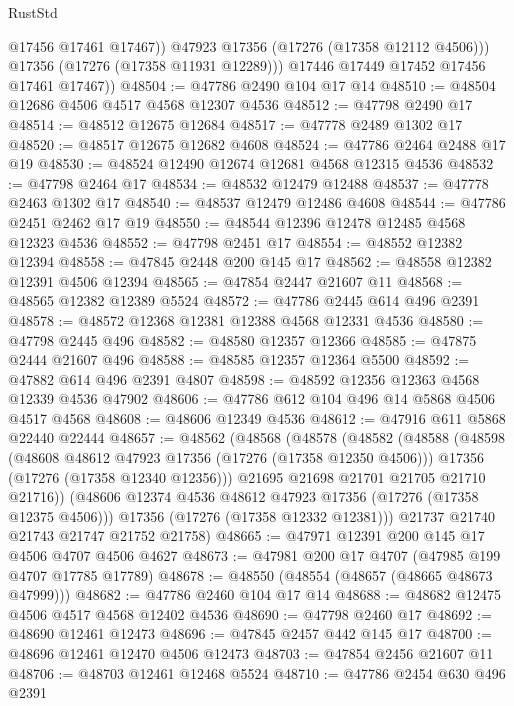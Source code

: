\begin{lexlean}{RustStd}
\begin{coremodule}
                @17456
                @17461
                @17467))
            @47923
            @17356
            (@17276 (@17358 @12112 @4506)))
          @17356
          (@17276 (@17358 @11931 @12289)))
        @17446
        @17449
        @17452
        @17456
        @17461
        @17467))
@48504 := @47786 @2490 @104 @17 @14
@48510 := @48504 @12686 @4506 @4517 @4568 @12307 @4536
@48512 := @47798 @2490 @17
@48514 := @48512 @12675 @12684
@48517 := @47778 @2489 @1302 @17
@48520 := @48517 @12675 @12682 @4608
@48524 := @47786 @2464 @2488 @17 @19
@48530 := @48524 @12490 @12674 @12681 @4568 @12315 @4536
@48532 := @47798 @2464 @17
@48534 := @48532 @12479 @12488
@48537 := @47778 @2463 @1302 @17
@48540 := @48537 @12479 @12486 @4608
@48544 := @47786 @2451 @2462 @17 @19
@48550 := @48544 @12396 @12478 @12485 @4568 @12323 @4536
@48552 := @47798 @2451 @17
@48554 := @48552 @12382 @12394
@48558 := @47845 @2448 @200 @145 @17
@48562 := @48558 @12382 @12391 @4506 @12394
@48565 := @47854 @2447 @21607 @11
@48568 := @48565 @12382 @12389 @5524
@48572 := @47786 @2445 @614 @496 @2391
@48578 := @48572 @12368 @12381 @12388 @4568 @12331 @4536
@48580 := @47798 @2445 @496
@48582 := @48580 @12357 @12366
@48585 := @47875 @2444 @21607 @496
@48588 := @48585 @12357 @12364 @5500
@48592 := @47882 @614 @496 @2391 @4807
@48598 := @48592 @12356 @12363 @4568 @12339 @4536 @47902
@48606 := @47786 @612 @104 @496 @14 @5868 @4506 @4517 @4568
@48608 := @48606 @12349 @4536
@48612 := @47916 @611 @5868 @22440 @22444
@48657 := @48562
    (@48568
      (@48578
        (@48582
          (@48588
            (@48598
              (@48608 @48612 @47923 @17356 (@17276 (@17358 @12350 @4506)))
              @17356
              (@17276 (@17358 @12340 @12356)))
            @21695
            @21698
            @21701
            @21705
            @21710
            @21716))
        (@48606 @12374 @4536 @48612 @47923 @17356 (@17276 (@17358 @12375 @4506)))
        @17356
        (@17276 (@17358 @12332 @12381)))
      @21737
      @21740
      @21743
      @21747
      @21752
      @21758)
@48665 := @47971 @12391 @200 @145 @17 @4506 @4707 @4506 @4627
@48673 := @47981 @200 @17 @4707 (@47985 @199 @4707 @17785 @17789)
@48678 := @48550 (@48554 (@48657 (@48665 @48673 @47999)))
@48682 := @47786 @2460 @104 @17 @14
@48688 := @48682 @12475 @4506 @4517 @4568 @12402 @4536
@48690 := @47798 @2460 @17
@48692 := @48690 @12461 @12473
@48696 := @47845 @2457 @442 @145 @17
@48700 := @48696 @12461 @12470 @4506 @12473
@48703 := @47854 @2456 @21607 @11
@48706 := @48703 @12461 @12468 @5524
@48710 := @47786 @2454 @630 @496 @2391

\end{coremodule}
\end{lexlean}
